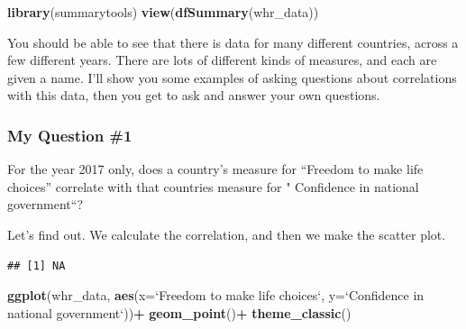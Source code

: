 \documentclass[]{book}
\newenvironment{Shaded}{\begin{snugshade}}{\end{snugshade}}
\newcommand{\KeywordTok}[1]{\textcolor[rgb]{0.13,0.29,0.53}{\textbf{#1}}}
\newcommand{\DataTypeTok}[1]{\textcolor[rgb]{0.13,0.29,0.53}{#1}}
\newcommand{\StringTok}[1]{\textcolor[rgb]{0.31,0.60,0.02}{#1}}
\newcommand{\OperatorTok}[1]{\textcolor[rgb]{0.81,0.36,0.00}{\textbf{#1}}}
\newcommand{\NormalTok}[1]{#1}
\begin{document}
\begin{Shaded}
\begin{Highlighting}[]
\KeywordTok{library}\NormalTok{(summarytools)}
\KeywordTok{view}\NormalTok{(}\KeywordTok{dfSummary}\NormalTok{(whr_data))}
\end{Highlighting}
\end{Shaded}

You should be able to see that there is data for many different
countries, across a few different years. There are lots of different
kinds of measures, and each are given a name. I'll show you some
examples of asking questions about correlations with this data, then you
get to ask and answer your own questions.

\subsubsection{My Question \#1}\label{my-question-1}

For the year 2017 only, does a country's measure for ``Freedom to make
life choices'' correlate with that countries measure for " Confidence in
national government``?

Let's find out. We calculate the correlation, and then we make the
scatter plot.

\begin{Shaded}
\end{Shaded}

\begin{verbatim}
## [1] NA
\end{verbatim}

\begin{Shaded}
\begin{Highlighting}[]
\KeywordTok{ggplot}\NormalTok{(whr_data, }\KeywordTok{aes}\NormalTok{(}\DataTypeTok{x=}\StringTok{`}\DataTypeTok{Freedom to make life choices}\StringTok{`}\NormalTok{,}
                     \DataTypeTok{y=}\StringTok{`}\DataTypeTok{Confidence in national government}\StringTok{`}\NormalTok{))}\OperatorTok{+}
\StringTok{  }\KeywordTok{geom_point}\NormalTok{()}\OperatorTok{+}
\StringTok{  }\KeywordTok{theme_classic}\NormalTok{()}
\end{Highlighting}
\end{Shaded}
\end{document}
